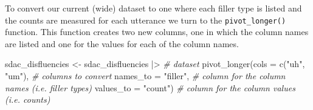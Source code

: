 \documentclass[
  letterpaper,
]{scrbook}
\newenvironment{Shaded}{\begin{snugshade}}{\end{snugshade}}
\newcommand{\AttributeTok}[1]{\textcolor[rgb]{0.00,0.00,0.00}{#1}}
\newcommand{\CommentTok}[1]{\textcolor[rgb]{0.00,0.00,0.00}{\textit{#1}}}
\newcommand{\FunctionTok}[1]{\textcolor[rgb]{0.00,0.00,0.00}{#1}}
\newcommand{\NormalTok}[1]{\textcolor[rgb]{0.00,0.00,0.00}{#1}}
\newcommand{\OtherTok}[1]{\textcolor[rgb]{0.00,0.00,0.00}{#1}}
\newcommand{\SpecialCharTok}[1]{\textcolor[rgb]{0.00,0.00,0.00}{#1}}
\newcommand{\StringTok}[1]{\textcolor[rgb]{0.00,0.00,0.00}{#1}}
\begin{document}
To convert our current (wide) dataset to one where each filler type is
listed and the counts are measured for each utterance we turn to the
\texttt{pivot\_longer()} function. This function creates two new
columns, one in which the column names are listed and one for the values
for each of the column names.

\begin{Shaded}
\begin{Highlighting}[]
\NormalTok{sdac\_disfluencies }\OtherTok{\textless{}{-}} 
\NormalTok{  sdac\_disfluencies }\SpecialCharTok{|\textgreater{}} \CommentTok{\# dataset}
  \FunctionTok{pivot\_longer}\NormalTok{(}\AttributeTok{cols =} \FunctionTok{c}\NormalTok{(}\StringTok{"uh"}\NormalTok{, }\StringTok{"um"}\NormalTok{), }\CommentTok{\# columns to convert}
               \AttributeTok{names\_to =} \StringTok{"filler"}\NormalTok{, }\CommentTok{\# column for the column names (i.e. filler types)}
               \AttributeTok{values\_to =} \StringTok{"count"}\NormalTok{) }\CommentTok{\# column for the column values (i.e. counts)}
\end{Highlighting}
\end{Shaded}
\end{document}
